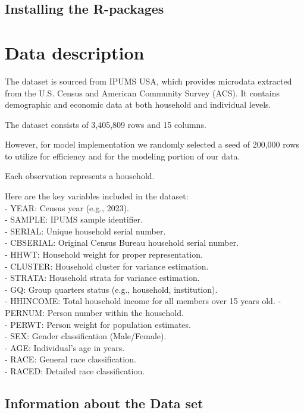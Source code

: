 \documentclass[
]{article}
\begin{document}
\subsection{Installing the R-packages}\label{installing-the-r-packages}

\section{Data description}\label{data-description}

The dataset is sourced from IPUMS USA, which provides microdata
extracted from the U.S. Census and American Community Survey (ACS). It
contains demographic and economic data at both household and individual
levels.

The dataset consists of 3,405,809 rows and 15 columns.

However, for model implementation we randomly selected a seed of 200,000
rows to utilize for efficiency and for the modeling portion of our data.

Each observation represents a household.

Here are the key variables included in the dataset:\\
- YEAR: Census year (e.g., 2023).\\
- SAMPLE: IPUMS sample identifier.\\
- SERIAL: Unique household serial number.\\
- CBSERIAL: Original Census Bureau household serial number.\\
- HHWT: Household weight for proper representation.\\
- CLUSTER: Household cluster for variance estimation.\\
- STRATA: Household strata for variance estimation.\\
- GQ: Group quarters status (e.g., household, institution).\\
- HHINCOME: Total household income for all members over 15 years old. -
PERNUM: Person number within the household.\\
- PERWT: Person weight for population estimates.\\
- SEX: Gender classification (Male/Female).\\
- AGE: Individual's age in years.\\
- RACE: General race classification.\\
- RACED: Detailed race classification.

\subsection{Information about the Data
set}\label{information-about-the-data-set}
\end{document}
